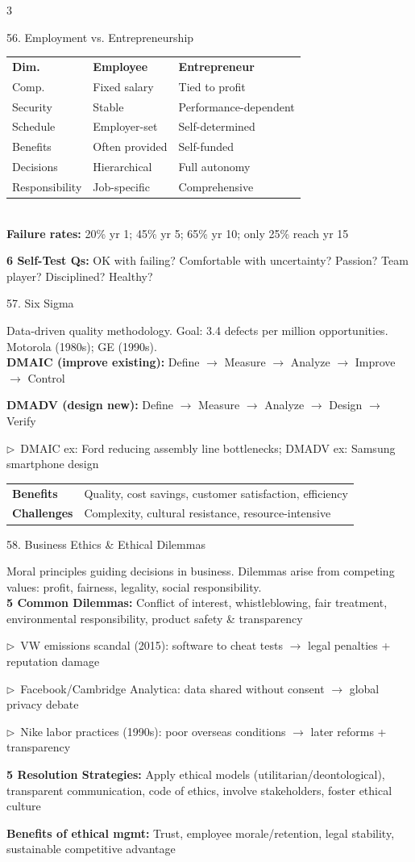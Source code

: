 \documentclass[7.5pt, letterpaper]{article}
\newcommand{\concept}[1]{%
  \vspace{2.5pt}%
  \noindent\colorbox{accent}{\parbox{\dimexpr\linewidth-2\fboxsep}{\fontsize{6.8pt}{7.5pt}\selectfont\bfseries\color{white}\strut #1\strut}}%
  \vspace{1pt}\par%
}
\newcommand{\kv}[2]{\noindent\textbf{#1:} #2\par}
\newcommand{\bul}[1]{\noindent$\triangleright$\ #1\par}
\newcommand{\minitab}[1]{%
  \begingroup
  \fontsize{6.2pt}{7pt}\selectfont
  \setlength{\tabcolsep}{2pt}
  #1
  \endgroup
}
\begin{document}
\begin{multicols}{3}
\concept{56. Employment vs. Entrepreneurship}
\minitab{\begin{tabular}{@{}lll@{}}
\textbf{Dim.} & \textbf{Employee} & \textbf{Entrepreneur}\\
Comp. & Fixed salary & Tied to profit\\
Security & Stable & Performance-dependent\\
Schedule & Employer-set & Self-determined\\
Benefits & Often provided & Self-funded\\
Decisions & Hierarchical & Full autonomy\\
Responsibility & Job-specific & Comprehensive\\
\end{tabular}}\\
\kv{Failure rates}{20\% yr 1; 45\% yr 5; 65\% yr 10; only 25\% reach yr 15}
\kv{6 Self-Test Qs}{OK with failing? Comfortable with uncertainty? Passion? Team player? Disciplined? Healthy?}

\concept{57. Six Sigma}
Data-driven quality methodology. Goal: 3.4 defects per million opportunities. Motorola (1980s); GE (1990s).\\
\kv{DMAIC (improve existing)}{Define $\to$ Measure $\to$ Analyze $\to$ Improve $\to$ Control}
\kv{DMADV (design new)}{Define $\to$ Measure $\to$ Analyze $\to$ Design $\to$ Verify}
\bul{DMAIC ex: Ford reducing assembly line bottlenecks; DMADV ex: Samsung smartphone design}
\minitab{\begin{tabular}{@{}ll@{}}
\textbf{Benefits} & Quality, cost savings, customer satisfaction, efficiency\\
\textbf{Challenges} & Complexity, cultural resistance, resource-intensive\\
\end{tabular}}

\concept{58. Business Ethics \& Ethical Dilemmas}
Moral principles guiding decisions in business. Dilemmas arise from competing values: profit, fairness, legality, social responsibility.\\
\kv{5 Common Dilemmas}{Conflict of interest, whistleblowing, fair treatment, environmental responsibility, product safety \& transparency}
\bul{VW emissions scandal (2015): software to cheat tests $\to$ legal penalties + reputation damage}
\bul{Facebook/Cambridge Analytica: data shared without consent $\to$ global privacy debate}
\bul{Nike labor practices (1990s): poor overseas conditions $\to$ later reforms + transparency}
\kv{5 Resolution Strategies}{Apply ethical models (utilitarian/deontological), transparent communication, code of ethics, involve stakeholders, foster ethical culture}
\kv{Benefits of ethical mgmt}{Trust, employee morale/retention, legal stability, sustainable competitive advantage}


\end{multicols}
\end{document}
